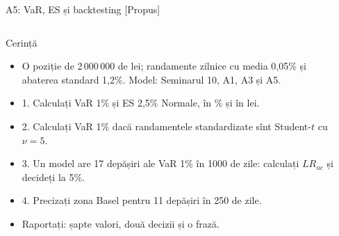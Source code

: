 \begin{frame}{A5: VaR, ES și backtesting [Propus]}
\propsub
\itemsize{\scriptsize}
\begin{columns}[T]
\begin{column}{\taskw}
\begin{block}{Cerință}
\begin{itemize}
    \item O poziție de 2\,000\,000 de lei; randamente zilnice cu media 0,05\% și abaterea standard 1,2\%. Model: Seminarul 10, A1, A3 și A5.
    \item 1. Calculați VaR 1\% și ES 2,5\% Normale, în \% și în lei.
    \item 2. Calculați VaR 1\% dacă randamentele standardizate sînt Student-$t$ cu $\nu = 5$.
    \item 3. Un model are 17 depășiri ale VaR 1\% în 1000 de zile: calculați $LR_{uc}$ și decideți la 5\%.
    \item 4. Precizați zona Basel pentru 11 depășiri în 250 de zile.
    \item Raportați: șapte valori, două decizii și o frază.
\end{itemize}
\end{block}
\end{column}
\begin{column}{\solw}
\end{column}
\end{columns}
\end{frame}

